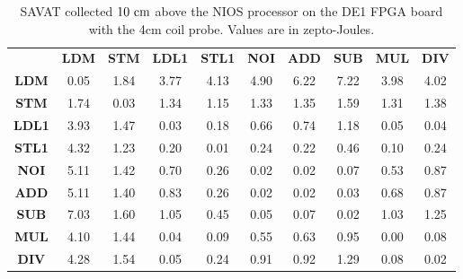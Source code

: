 \begin{table}[htb]
  \scriptsize
  \setlength{\tabcolsep}{2.3pt}
  \setlength\extrarowheight{1pt}
  \caption{SAVAT collected $10~{\rm cm}$ above the NIOS processor on the DE1 FPGA board with the 4cm coil probe. Values are in zepto-Joules.}
  \begin{tabu}{|c||c|c|c|c|c|c|c|c|c|} \hline
    & \textbf{LDM} & \textbf{STM} & \textbf{LDL1} & \textbf{STL1} & \textbf{NOI} & \textbf{ADD} & \textbf{SUB} & \textbf{MUL} & \textbf{DIV}
    \\ \hhline{|=||=|=|=|=|=|=|=|=|=|}
    \textbf{LDM} &  {0.05} &  {1.84} &  {3.77} &  {4.13} &  {4.90} &  {6.22} &  {7.22} &  {3.98} &  {4.02} \\ \hline
    \textbf{STM} &  {1.74} &  {0.03} &  {1.34} &  {1.15} &  {1.33} &  {1.35} &  {1.59} &  {1.31} &  {1.38} \\ \hline
    \textbf{LDL1} &  {3.93} &  {1.47} &  {0.03} &  {0.18} &  {0.66} &  {0.74} &  {1.18} &  {0.05} &  {0.04} \\ \hline
    \textbf{STL1} &  {4.32} &  {1.23} &  {0.20} &  {0.01} &  {0.24} &  {0.22} &  {0.46} &  {0.10} &  {0.24} \\ \hline
    \textbf{NOI} &  {5.11} &  {1.42} &  {0.70} &  {0.26} &  {0.02} &  {0.02} &  {0.07} &  {0.53} &  {0.87} \\ \hline
    \textbf{ADD} &  {5.11} &  {1.40} &  {0.83} &  {0.26} &  {0.02} &  {0.02} &  {0.03} &  {0.68} &  {0.87} \\ \hline
    \textbf{SUB} &  {7.03} &  {1.60} &  {1.05} &  {0.45} &  {0.05} &  {0.07} &  {0.02} &  {1.03} &  {1.25} \\ \hline
    \textbf{MUL} &  {4.10} &  {1.44} &  {0.04} &  {0.09} &  {0.55} &  {0.63} &  {0.95} &  {0.00} &  {0.08} \\ \hline
    \textbf{DIV} &  {4.28} &  {1.54} &  {0.05} &  {0.24} &  {0.91} &  {0.92} &  {1.29} &  {0.08} &  {0.02} \\ \hline

     \end{tabu}

  \label{fig:FPGA}
\end{table}


